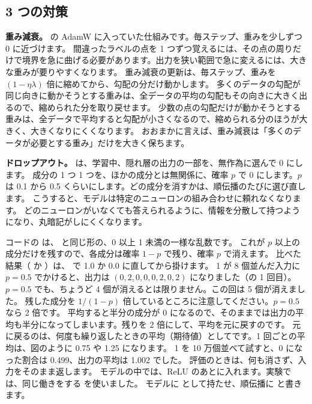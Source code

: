 \subsection*{3 つの対策}

\textbf{重み減衰。}
の AdamW に入っていた仕組みです。毎ステップ、重みを少しずつ 0 に近づけます。
間違ったラベルの点を 1 つずつ覚えるには、その点の周りだけで境界を急に曲げる必要があります。出力を狭い範囲で急に変えるには、大きな重みが要りやすくなります。
重み減衰の更新は、毎ステップ、重みを $(1-\eta\lambda)$ 倍に縮めてから、勾配の分だけ動かします。
多くのデータの勾配が同じ向きに動かそうとする重みは、全データの平均の勾配もその向きに大きく出るので、縮められた分を取り戻せます。
少数の点の勾配だけが動かそうとする重みは、全データで平均すると勾配が小さくなるので、縮められる分のほうが大きく、大きくなりにくくなります。
おおまかに言えば、重み減衰は「多くのデータが必要とする重み」だけを大きく保ちます。

\textbf{ドロップアウト。}
は、学習中、隠れ層の出力の一部を、無作為に選んで 0 にします\cite{srivastava2014dropout}。
成分の 1 つ 1 つを、ほかの成分とは無関係に、確率 $p$ で 0 にします。$p$ は 0.1 から 0.5 くらいにします。どの成分を消すかは、順伝播のたびに選び直します。
こうすると、モデルは特定のニューロンの組み合わせに頼れなくなります。
どのニューロンがいなくても答えられるように、情報を分散して持つようになり、丸暗記がしにくくなります。


コードの  は、 と同じ形の、0 以上 1 未満の一様な乱数です。
これが $p$ 以上の成分だけを残すので、各成分は確率 $1-p$ で残り、確率 $p$ で消えます。
比べた結果（ か ）は、 で 1.0 か 0.0 に直してから掛けます。
1 が 8 個並んだ入力に $p=0.5$ でかけると、出力は $(0,2,0,0,0,2,0,2)$ になりました（の 1 回目）。
$p=0.5$ でも、ちょうど 4 個が消えるとは限りません。この回は 5 個が消えました。
残した成分を $1/(1-p)$ 倍しているところに注意してください。$p=0.5$ なら 2 倍です。
平均すると半分の成分が 0 になるので、そのままでは出力の平均も半分になってしまいます。残りを 2 倍にして、平均を元に戻すのです。
元に戻るのは、何度も繰り返したときの平均（期待値）としてです。1 回ごとの平均は、図のように 0.75 や 1.25 になります。
1 を 10 万個並べて試すと、0 になった割合は 0.499、出力の平均は 1.002 でした。
評価のときは、何も消さず、入力をそのまま返します。
モデルの中では、ReLU のあとに入れます。実験では、同じ働きをする  を使いました。
モデルに  として持たせ、順伝播に  と書きます。

